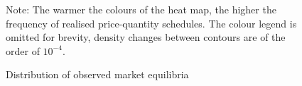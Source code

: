 \begin{figure}[H]
\begin{center}
\caption{Distribution of observed market equilibria}
\label{g7f}
\end{center}
{ \small Note: The warmer the colours of the heat map, the higher the frequency of realised price-quantity schedules. The colour legend is omitted for brevity, density changes between contours are of the order of $10^{-4}$.} 
\end{figure}





%
%
%
%



%
%
%

\label{statdes1}
%

